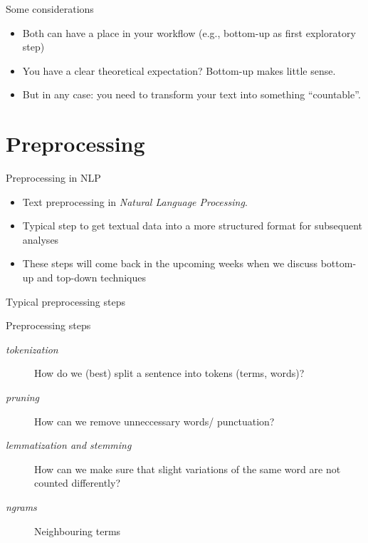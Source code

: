 \documentclass[handout]{beamer}
\begin{document}

\begin{frame}{Some considerations}
	\begin{itemize}[<+->]
		\item Both can have a place in your workflow (e.g., bottom-up as first exploratory step)
		\item You have a clear theoretical expectation? Bottom-up makes little sense.
		\item But in any case: you need to transform your text into something ``countable''.
	\end{itemize}
\end{frame}

\section{Preprocessing}

\begin{frame}
	\begin{block}{Preprocessing in NLP}
		\begin{itemize}	
	\item Text preprocessing in \emph{Natural Language Processing}. 
	\item Typical step to get textual data into a more structured format for subsequent analyses
	\item These steps will come back in the upcoming weeks when we discuss bottom-up and top-down techniques
		\end{itemize}
\end{block}
\end{frame}

\begin{frame}{Typical preprocessing steps}
	\begin{block}{Preprocessing steps}
		\begin{description}
			\item [\emph{tokenization}] How do we (best) split a sentence into tokens (terms, words)?
			\item [\emph{pruning}] How can we remove unneccessary words/ punctuation?
			\item [\emph{lemmatization and stemming}] How can we make sure that slight variations of the same word are not counted differently?
			\item [\emph{ngrams}] Neighbouring terms
		\end{description}
	\end{block}
\end{frame}
\end{document}
